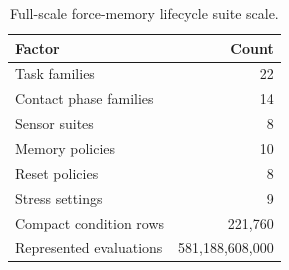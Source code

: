 \begin{table}[t]
\centering
\caption{Full-scale force-memory lifecycle suite scale.}
\label{tab:scale}
\small
\begin{tabular}{lr}
\toprule
Factor & Count \\
\midrule
Task families & 22 \\
Contact phase families & 14 \\
Sensor suites & 8 \\
Memory policies & 10 \\
Reset policies & 8 \\
Stress settings & 9 \\
Compact condition rows & 221,760 \\
Represented evaluations & 581,188,608,000 \\
\bottomrule
\end{tabular}
\end{table}
